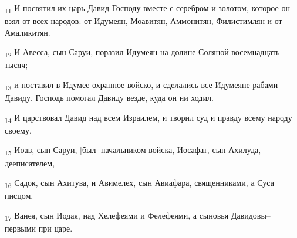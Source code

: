 \begin{tcolorbox}
\textsubscript{11} И посвятил их царь Давид Господу вместе с серебром и золотом, которое он взял от всех народов: от Идумеян, Моавитян, Аммонитян, Филистимлян и от Амаликитян.
\end{tcolorbox}
\begin{tcolorbox}
\textsubscript{12} И Авесса, сын Саруи, поразил Идумеян на долине Соляной восемнадцать тысяч;
\end{tcolorbox}
\begin{tcolorbox}
\textsubscript{13} и поставил в Идумее охранное войско, и сделались все Идумеяне рабами Давиду. Господь помогал Давиду везде, куда он ни ходил.
\end{tcolorbox}
\begin{tcolorbox}
\textsubscript{14} И царствовал Давид над всем Израилем, и творил суд и правду всему народу своему.
\end{tcolorbox}
\begin{tcolorbox}
\textsubscript{15} Иоав, сын Саруи, [был] начальником войска, Иосафат, сын Ахилуда, дееписателем,
\end{tcolorbox}
\begin{tcolorbox}
\textsubscript{16} Садок, сын Ахитува, и Авимелех, сын Авиафара, священниками, а Суса писцом,
\end{tcolorbox}
\begin{tcolorbox}
\textsubscript{17} Ванея, сын Иодая, над Хелефеями и Фелефеями, а сыновья Давидовы--первыми при царе.
\end{tcolorbox}
